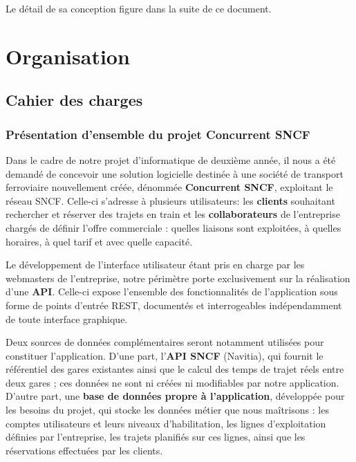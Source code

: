 \documentclass[12pt,a4paper]{report}
\begin{document}
\vspace{0.3cm}

\noindent Le détail de sa conception figure dans la suite de ce document.

\tableofcontents

\chapter{Organisation}

\section{Cahier des charges}


\subsection*{Présentation d'ensemble du projet Concurrent SNCF}

Dans le cadre de notre projet d'informatique de deuxième année, il nous a été demandé de concevoir une solution logicielle destinée à une société de
transport ferroviaire nouvellement créée, dénommée \textbf{Concurrent SNCF}, exploitant le réseau SNCF. Celle-ci s'adresse à plusieurs utilisateurs: les \textbf{clients} souhaitant rechercher et réserver
des trajets en train et les \textbf{collaborateurs} de
l'entreprise chargés de définir l'offre commerciale : quelles liaisons sont
exploitées, à quelles horaires, à quel tarif et avec quelle capacité.

Le développement de l'interface utilisateur étant pris en charge par les
webmasters de l'entreprise, notre périmètre porte exclusivement sur la
réalisation d'une \textbf{API}. Celle-ci expose l'ensemble des
fonctionnalités de l'application sous forme de points d'entrée REST,
documentés et interrogeables indépendamment de toute interface graphique.

Deux sources de données complémentaires seront notamment utilisées pour constituer l'application. D'une
part, l'\textbf{API SNCF} (Navitia), qui fournit le référentiel des gares
existantes ainsi que le calcul des temps de trajet réels entre deux gares ;
ces données ne sont ni créées ni modifiables par notre application. D'autre
part, une \textbf{base de données propre à l'application}, développée pour
les besoins du projet, qui stocke les données métier que nous maîtrisons :
les comptes utilisateurs et leurs niveaux d'habilitation, les lignes
d'exploitation définies par l'entreprise, les trajets planifiés sur ces
lignes, ainsi que les réservations effectuées par les clients.
\end{document}
